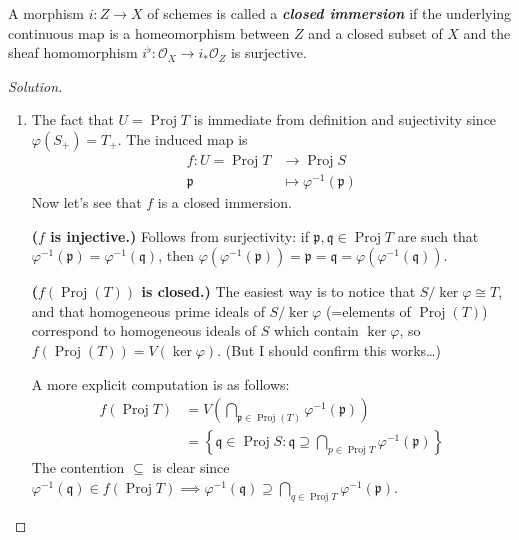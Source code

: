 \begin{defn}[3.41 Gortz]
	A morphism $i:Z\to X$ of schemes is called a \textit{\textbf{closed immersion}} if the underlying continuous map is a homeomorphism between $Z$ and a closed subset of $X$ and the sheaf homomorphism $i^\flat:\mathcal{O}_X\longrightarrow i_*\mathcal{O}_Z$ is surjective.
\end{defn}

\begin{proof}[Solution]\leavevmode
	\begin{enumerate}[label=\alph*.]
	\item The fact that $U=\operatorname{Proj}T$ is immediate from definition and sujectivity since  $\varphi(S_+)=T_+$.  The induced map is
		\begin{align*}
			f: U= \operatorname{Proj}T &\longrightarrow \operatorname{Proj}S \\
			\mathfrak{p} &\longmapsto \varphi^{-1}(\mathfrak{p})
		\end{align*}
	Now let's see that $f$ is a closed immersion. 

	{\color{6}\bfseries ($f$ is injective.)}\hspace{.5em} Follows from surjectivity: if $\mathfrak{p},\mathfrak{q}\in\operatorname{Proj}T$ are such that $\varphi^{-1}(\mathfrak{p})=\varphi^{-1}(\mathfrak{q})$, then $\varphi(\varphi^{-1}(\mathfrak{p}))=\mathfrak{p}=\mathfrak{q}=\varphi(\varphi^{-1}(\mathfrak{q}))$.

	{\color{6}\bfseries ($f \left(\operatorname{Proj}(T)\right)$ is closed.)}\hspace{.5em} The easiest way is to notice that $S/\ker \varphi\cong T$, and that homogeneous prime ideals of $S/\ker \varphi$ (=elements of $\operatorname{Proj}(T)$) correspond to homogeneous ideals of $S$ which contain $\ker \varphi$, so $f(\operatorname{Proj}(T))=V(\ker \varphi)$. (But I should confirm this works…)

	A more explicit computation is as follows:
	\begin{align*}f(\operatorname{Proj}T)&=V\left(\bigcap_{\mathfrak{p}\in\operatorname{Proj}(T)}\varphi^{-1}(\mathfrak{p})\right)\\
		&=\left\{ \mathfrak{q}\in\operatorname{Proj}S:\mathfrak{q}\supseteq\bigcap_{p\in\operatorname{Proj}T} \varphi^{-1}(\mathfrak{p}) \right\} 
		\end{align*}
The contention $\subseteq$ is clear since  $\varphi^{-1}(\mathfrak{q})\in f(\operatorname{Proj}T)\implies \varphi^{-1}(\mathfrak{q})\supseteq\bigcap_{q\in\operatorname{Proj}T} \varphi^{-1}(\mathfrak{p})$.


\end{enumerate}
\end{proof}
